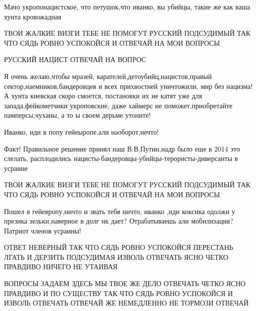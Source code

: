 \qqSledovatel

\qqSudVopros

\qqPodsudimyj

Мачо укропонацистское, что петушок,что иванко, вы убийцы, такие же как ваша
хунта кровожадная

\qqSledovatel

ТВОИ ЖАЛКИЕ ВИЗГИ ТЕБЕ НЕ ПОМОГУТ РУССКИЙ ПОДСУДИМЫЙ ТАК ЧТО СЯДЬ РОВНО
УСПОКОЙСЯ И ОТВЕЧАЙ НА МОИ ВОПРОСЫ

\qqSledovatel

РУССКИЙ НАЦИСТ ОТВЕЧАЙ НА ВОПРОС

\qqSledovatel

\qqSudVopros

\qqPodsudimyj

Я очень желаю,чтобы мразей, карателей,детоубийц,нацистов,правый
сектор,наемников,бандеровцев и всех прихвостней уничтожили, мир без нацизма! А
хунта киевская скоро смоется, постановки их не катят уже для
запада,фейкометчики укроповские, даже хаймерс не поможет,приобретайте
памперсы,чуханы, а то ы своем дерьме утоните!

Иванко, иди в попу гейеыропе,али наоборот,нечто!

\qqSledovatel

\qqSudVopros

\qqPodsudimyj

Факт! Правильное решение принял наш В.В.Путин,надр было еше в 2014 это слелать,
расплодились нацисты-бандеровцы-убийцы-терористы-диверсанты в усраине

\qqSledovatel

ТВОИ ЖАЛКИЕ ВИЗГИ ТЕБЕ НЕ ПОМОГУТ РУССКИЙ ПОДСУДИМЫЙ ТАК ЧТО СЯДЬ РОВНО
УСПОКОЙСЯ И ОТВЕЧАЙ НА МОИ ВОПРОСЫ

\qqSledovatel

\qqSudVopros

\qqPodsudimyj

Пошел в гейевропу,ничто и звать тебя ничто, иванко ,иди коксика одолжи у
презика зельки,наверное в долг нк дает? Отрабатываешь али мобилизация? Патриот
членов усраины!

\qqSledovatel

ОТВЕТ НЕВЕРНЫЙ ТАК ЧТО СЯДЬ РОВНО УСПОКОЙСЯ ПЕРЕСТАНЬ ЛГАТЬ И ДЕРЗИТЬ
ПОДСУДИМАЯ ИЗВОЛЬ ОТВЕЧАТЬ ЯСНО ЧЕТКО ПРАВДИВО НИЧЕГО НЕ УТАИВАЯ

\qqSledovatel

ВОПРОСЫ ЗАДАЕМ ЗДЕСЬ МЫ ТВОЕ ЖЕ ДЕЛО ОТВЕЧАТЬ ЧЕТКО ЯСНО ПРАВДИВО И ПО СУЩЕСТВУ
ТАК ЧТО СЯДЬ РОВНО УСПОКОЙСЯ И ИЗВОЛЬ ОТВЕЧАТЬ ОТВЕЧАЙ ЖЕ НЕМЕДЛЕННО НЕ ТОРМОЗИ
ОТВЕЧАЙ

